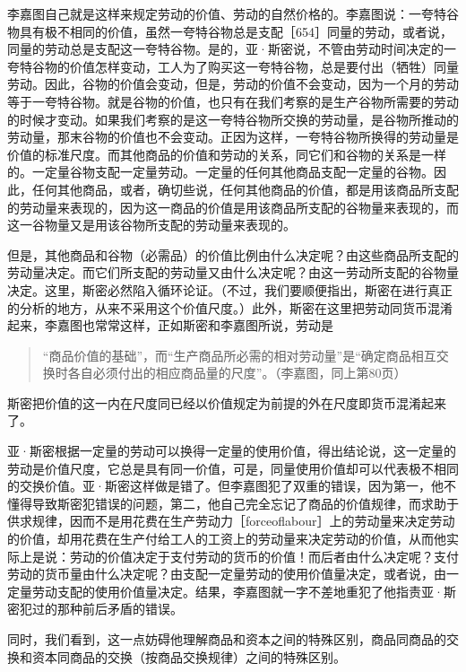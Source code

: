 李嘉图自己就是这样来规定劳动的价值、劳动的自然价格的。李嘉图说：一夸特谷物具有极不相同的价值，虽然一夸特谷物总是支配［654］同量的劳动，或者说，同量的劳动总是支配这一夸特谷物。是的，亚·斯密说，不管由劳动时间决定的一夸特谷物的价值怎样变动，工人为了购买这一夸特谷物，总是要付出（牺牲）同量劳动。因此，谷物的价值会变动，但是，劳动的价值不会变动，因为一个月的劳动等于一夸特谷物。就是谷物的价值，也只有在我们考察的是生产谷物所需要的劳动的时候才变动。如果我们考察的是这一夸特谷物所交换的劳动量，是谷物所推动的劳动量，那末谷物的价值也不会变动。正因为这样，一夸特谷物所换得的劳动量是价值的标准尺度。而其他商品的价值和劳动的关系，同它们和谷物的关系是一样的。一定量谷物支配一定量劳动。一定量的任何其他商品支配一定量的谷物。因此，任何其他商品，或者，确切些说，任何其他商品的价值，都是用该商品所支配的劳动量来表现的，因为这一商品的价值是用该商品所支配的谷物量来表现的，而这一谷物量又是用该谷物所支配的劳动量来表现的。

但是，其他商品和谷物（必需品）的价值比例由什么决定呢？由这些商品所支配的劳动量决定。而它们所支配的劳动量又由什么决定呢？由这一劳动所支配的谷物量决定。这里，斯密必然陷入循环论证。（不过，我们要顺便指出，斯密在进行真正的分析的地方，从来不采用这个价值尺度。）此外，斯密在这里把劳动同货币混淆起来，李嘉图也常常这样，正如斯密和李嘉图所说，劳动是

\begin{quote}{“商品价值的基础”，而“生产商品所必需的相对劳动量”是“确定商品相互交换时各自必须付出的相应商品量的尺度”。（李嘉图，同上第80页）}\end{quote}

斯密把价值的这一内在尺度同已经以价值规定为前提的外在尺度即货币混淆起来了。

亚·斯密根据一定量的劳动可以换得一定量的使用价值，得出结论说，这一定量的劳动是价值尺度，它总是具有同一价值，可是，同量使用价值却可以代表极不相同的交换价值。亚·斯密这样做是错了。但李嘉图犯了双重的错误，因为第一，他不懂得导致斯密犯错误的问题，第二，他自己完全忘记了商品的价值规律，而求助于供求规律，因而不是用花费在生产劳动力［forceoflabour］上的劳动量来决定劳动的价值，却用花费在生产付给工人的工资上的劳动量来决定劳动的价值，从而他实际上是说：劳动的价值决定于支付劳动的货币的价值！而后者由什么决定呢？支付劳动的货币量由什么决定呢？由支配一定量劳动的使用价值量决定，或者说，由一定量劳动支配的使用价值量决定。结果，李嘉图就一字不差地重犯了他指责亚·斯密犯过的那种前后矛盾的错误。

同时，我们看到，这一点妨碍他理解商品和资本之间的特殊区别，商品同商品的交换和资本同商品的交换（按商品交换规律）之间的特殊区别。

